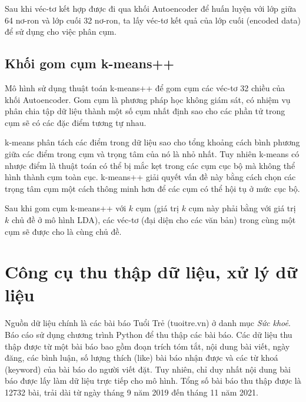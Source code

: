 
Sau khi véc-tơ kết hợp được đi qua khối Autoencoder để huấn luyện với lớp giữa
64 nơ-ron và lớp cuối 32 nơ-ron, ta lấy véc-tơ kết quả của lớp cuối (encoded
data) để sử dụng cho việc phân cụm.

\subsection{Khối gom cụm k-means++}
Mô hình sử dụng thuật toán k-means++ để gom cụm các véc-tơ 32 chiều của khối
Autoencoder. Gom cụm là phương pháp học không giám sát, có nhiệm vụ phân chia
tập dữ liệu thành một số cụm nhất định sao cho các phần tử trong cụm sẽ có các
đặc điểm tương tự nhau.

k-means phân tách các điểm trong dữ liệu sao cho tổng khoảng cách bình phương
giữa các điểm trong cụm và trọng tâm của nó là nhỏ nhất. Tuy nhiên k-means có
nhược điểm là thuật toán có thể bị mắc kẹt trong các cụm cục bộ mà không thể
hình thành cụm toàn cục. k-means++ giải quyết vấn đề này bằng cách chọn các
trọng tâm cụm một cách thông minh hơn để các cụm có thể hội tụ ở mức cục bộ.

Sau khi gom cụm k-means++ với $k$ cụm (giá trị $k$ cụm này phải bằng với giá
trị $k$ chủ đề ở mô hình LDA), các véc-tơ (đại diện cho các văn bản) trong cùng
một cụm sẽ được cho là cùng chủ đề.


\section{Công cụ thu thập dữ liệu, xử lý dữ liệu}

Nguồn dữ liệu chính là các bài báo Tuổi Trẻ (tuoitre.vn) ở danh mục \textit{Sức
khoẻ}. Báo cáo sử dụng chương trình Python để thu thập các bài báo. Các dữ liệu
thu thập được từ một bài báo bao gồm đoạn trích tóm tắt, nội dung bài viết,
ngày đăng, các bình luận, số lượng thích (like) bài báo nhận được và các từ
khoá (keyword) của bài báo do người viết đặt. Tuy nhiên, chỉ duy nhất nội dung
bài báo được lấy làm dữ liệu trực tiếp cho mô hình. Tổng số bài báo thu thập
được là 12732 bài, trải dài từ ngày tháng 9 năm 2019 đến tháng 11 năm 2021.

